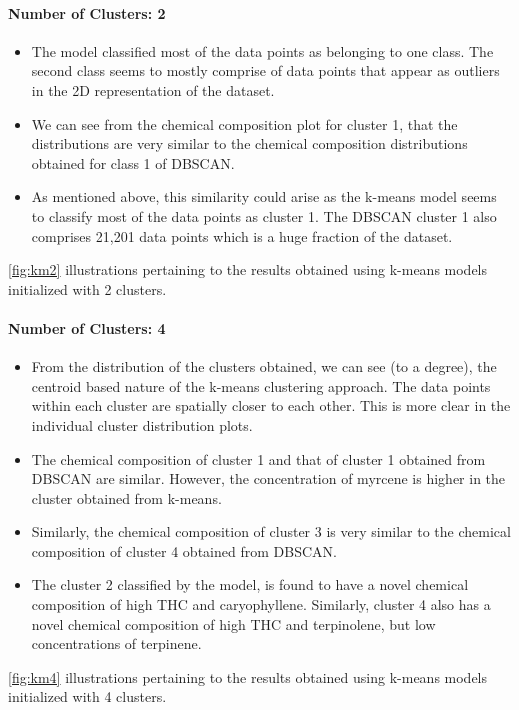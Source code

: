 \documentclass[11pt,a4paper]{article}
\begin{document}
\paragraph{Number of Clusters: 2}
\begin{itemize}
	\itemsep0em
	\item The model classified most of the data points as belonging to one class. The second class seems to mostly comprise of data points that appear as outliers in the 2D representation of the dataset.
	\item We can see from the chemical composition plot for cluster 1, that the distributions are very similar to the chemical composition distributions obtained for class 1 of DBSCAN. 
	\item As mentioned above, this similarity could arise as the k-means model seems to classify most of the data points as cluster 1. The DBSCAN cluster 1 also comprises 21,201 data points which is a huge fraction of the dataset.
\end{itemize}
\autoref{fig:km2} illustrations pertaining to the results obtained using k-means models initialized with 2 clusters.

\paragraph{Number of Clusters: 4}
\begin{itemize}
	\itemsep0em
	\item From the distribution of the clusters obtained, we can see (to a degree), the centroid based nature of the k-means clustering approach. The data points within each cluster are spatially closer to each other. This is more clear in the individual cluster distribution plots.
	\item The chemical composition of cluster 1 and that of cluster 1 obtained from DBSCAN are similar. However, the concentration of myrcene is higher in the cluster obtained from k-means.
	\item Similarly, the chemical composition of cluster 3 is very similar to the chemical composition of cluster 4 obtained from DBSCAN.
	\item The cluster 2 classified by the model, is found to have a novel chemical composition of high THC and caryophyllene. Similarly, cluster 4 also has a novel chemical composition of high THC and terpinolene, but low concentrations of terpinene.
\end{itemize}
\autoref{fig:km4} illustrations pertaining to the results obtained using k-means models initialized with 4 clusters.
\end{document}
